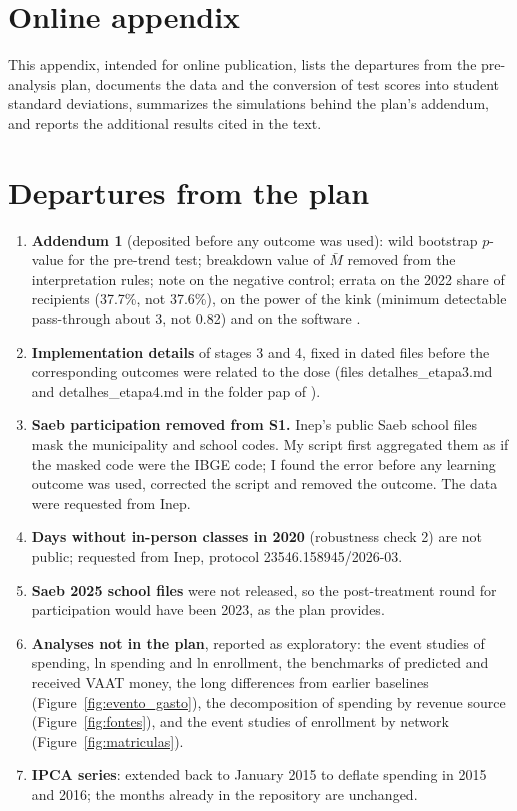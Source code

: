 \documentclass[12pt,letterpaper]{article}
\begin{document}
\section*{Online appendix}

This appendix, intended for online publication, lists the departures from the pre-analysis plan, documents the data and the conversion of test scores into student standard deviations, summarizes the simulations behind the plan's addendum, and reports the additional results cited in the text.

\appendix
\section{Departures from the plan}\label{app:desvios}

\begin{enumerate}[label=A\arabic*.]
\item \textbf{Addendum 1} (deposited before any outcome was used): wild bootstrap $p$-value for the pre-trend test; breakdown value of $\bar M$ removed from the interpretation rules; note on the negative control; errata on the 2022 share of recipients (37.7\%, not 37.6\%), on the power of the kink (minimum detectable pass-through about 3, not 0.82) and on the software \citep{cunha2026add}.
\item \textbf{Implementation details} of stages 3 and 4, fixed in dated files before the corresponding outcomes were related to the dose (files detalhes\_etapa3.md and detalhes\_etapa4.md in the folder pap of \citealp{cunha2026a}).
\item \textbf{Saeb participation removed from S1.} Inep's public Saeb school files mask the municipality and school codes. My script first aggregated them as if the masked code were the IBGE code; I found the error before any learning outcome was used, corrected the script and removed the outcome. The data were requested from Inep.
\item \textbf{Days without in-person classes in 2020} (robustness check 2) are not public; requested from Inep, protocol 23546.158945/2026-03.
\item \textbf{Saeb 2025 school files} were not released, so the post-treatment round for participation would have been 2023, as the plan provides.
\item \textbf{Analyses not in the plan}, reported as exploratory: the event studies of spending, ln spending and ln enrollment, the benchmarks of predicted and received VAAT money, the long differences from earlier baselines (Figure~\ref{fig:evento_gasto}), the decomposition of spending by revenue source (Figure~\ref{fig:fontes}), and the event studies of enrollment by network (Figure~\ref{fig:matriculas}).
\item \textbf{IPCA series}: extended back to January 2015 to deflate spending in 2015 and 2016; the months already in the repository are unchanged.
\end{enumerate}
\end{document}
